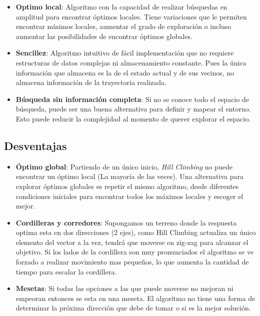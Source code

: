 \documentclass[12pt,twoside]{article}
\begin{document}
	\begin{itemize}
		\item \textbf{Optimo local}: Algoritmo con la capacidad de realizar búsquedas en amplitud para encontrar óptimos locales. Tiene variaciones que le permiten encontrar mínimos locales, aumentar el grado de exploración o incluso aumentar las posibilidades de encontrar óptimos globales.
		
		\item \textbf{Sencillez}: Algoritmo intuitivo de fácil implementación que no requiere estructuras de datos complejas ni almacenamiento constante. Pues la única información que almacena es la de el estado actual y de sus vecinos, no almacena información de la trayectoria realizada.
		
		\item \textbf{Búsqueda sin información completa}: Si no se conoce todo el espacio de búsqueda, puede ser una buena alternativa para definir y mapear el entorno. Esto puede reducir la complejidad al momento de querer explorar el espacio.
		
	\end{itemize}
	
	
	\subsection{Desventajas}
	
	\begin{itemize}
		\item \textbf{Óptimo global}: Partiendo de un único inicio, \textit{Hill Climbing} no puede encontrar un óptimo local (La mayoría de las veces). Una alternativa para explorar óptimos globales es repetir el mismo algoritmo, desde diferentes condiciones iniciales para encontrar todos los máximos locales y escoger el mejor. 
		
		\item \textbf{Cordilleras y corredores}: Supongamos un terreno donde la respuesta optima esta en dos direcciones (2 ejes), como Hill Climbing actualiza un único elemento del vector a la vez, tendrá que moverse en zig-zag para alcanzar el objetivo.  Si los lados de la cordillera son muy pronunciados el algoritmo se ve forzado a realizar movimiento mas pequeños, lo que aumenta la cantidad de tiempo para escalar la cordillera.
		
		\item \textbf{Mesetas}: Si todas las opciones a las que puede moverse no mejoran ni empeoran entonces se esta en una meseta. El algoritmo no tiene una forma de determinar la próxima dirección que debe de tomar o si es la mejor solución. 
	\end{itemize}
\end{document}
